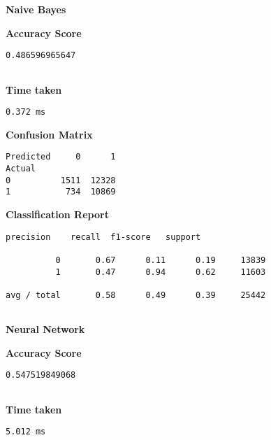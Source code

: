 \documentclass[11pt]{article}
\begin{document}
    \textbf{Naive Bayes}

    
    \textbf{Accuracy Score}

    
    \begin{Verbatim}[commandchars=\\\{\}]
0.486596965647


    \end{Verbatim}

    \textbf{Time taken}

    
    \begin{Verbatim}[commandchars=\\\{\}]
0.372 ms

    \end{Verbatim}

    \textbf{Confusion Matrix}

    
    \begin{Verbatim}[commandchars=\\\{\}]
Predicted     0      1
Actual                
0          1511  12328
1           734  10869

    \end{Verbatim}

    \textbf{Classification Report}

    
    \begin{Verbatim}[commandchars=\\\{\}]
             precision    recall  f1-score   support

          0       0.67      0.11      0.19     13839
          1       0.47      0.94      0.62     11603

avg / total       0.58      0.49      0.39     25442


    \end{Verbatim}

    \textbf{Neural Network}

    
    \textbf{Accuracy Score}

    
    \begin{Verbatim}[commandchars=\\\{\}]
0.547519849068


    \end{Verbatim}

    \textbf{Time taken}

    
    \begin{Verbatim}[commandchars=\\\{\}]
5.012 ms

    \end{Verbatim}
\end{document}
